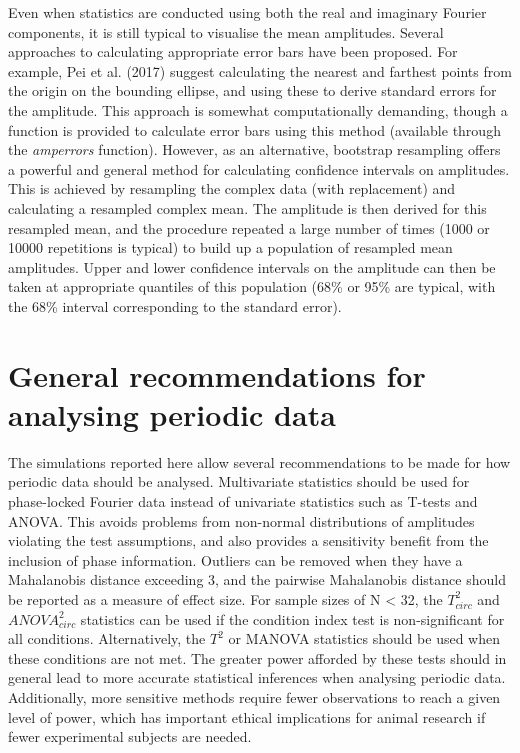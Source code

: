 \documentclass[]{article}
\begin{document}
Even when statistics are conducted using both the real and imaginary Fourier components, it is still typical to visualise the mean amplitudes. Several approaches to calculating appropriate error bars have been proposed. For example, Pei et al. (2017) suggest calculating the nearest and farthest points from the origin on the bounding ellipse, and using these to derive standard errors for the amplitude. This approach is somewhat computationally demanding, though a function is provided to calculate error bars using this method (available through the \emph{amperrors} function). However, as an alternative, bootstrap resampling offers a powerful and general method for calculating confidence intervals on amplitudes. This is achieved by resampling the complex data (with replacement) and calculating a resampled complex mean. The amplitude is then derived for this resampled mean, and the procedure repeated a large number of times (1000 or 10000 repetitions is typical) to build up a population of resampled mean amplitudes. Upper and lower confidence intervals on the amplitude can then be taken at appropriate quantiles of this population (68\% or 95\% are typical, with the 68\% interval corresponding to the standard error).

\hypertarget{general-recommendations-for-analysing-periodic-data}{%
\section{General recommendations for analysing periodic data}\label{general-recommendations-for-analysing-periodic-data}}

The simulations reported here allow several recommendations to be made for how periodic data should be analysed. Multivariate statistics should be used for phase-locked Fourier data instead of univariate statistics such as T-tests and ANOVA. This avoids problems from non-normal distributions of amplitudes violating the test assumptions, and also provides a sensitivity benefit from the inclusion of phase information. Outliers can be removed when they have a Mahalanobis distance exceeding 3, and the pairwise Mahalanobis distance should be reported as a measure of effect size. For sample sizes of N \textless{} 32, the \(T^2_{circ}\) and \(ANOVA^2_{circ}\) statistics can be used if the condition index test is non-significant for all conditions. Alternatively, the \(T^2\) or MANOVA statistics should be used when these conditions are not met. The greater power afforded by these tests should in general lead to more accurate statistical inferences when analysing periodic data. Additionally, more sensitive methods require fewer observations to reach a given level of power, which has important ethical implications for animal research if fewer experimental subjects are needed.
\end{document}
